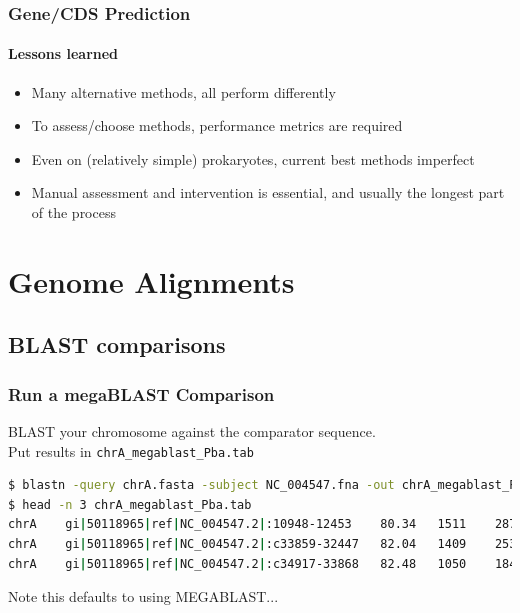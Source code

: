 \documentclass[table]{beamer}
\begin{document}
    \begin{frame}
      \frametitle{Gene/CDS Prediction}   
      \framesubtitle{Lessons learned}   
      \begin{itemize}
        \item Many alternative methods, all perform differently
        \item To assess/choose methods, performance metrics are required
        \item Even on (relatively simple) prokaryotes, current best methods imperfect
        \item Manual assessment and intervention is essential, and usually the longest part of the process
      \end{itemize}
    \end{frame}
    
    
\section{Genome Alignments}
  \subsection{BLAST comparisons}
  \begin{frame}[fragile]
    \frametitle{Run a megaBLAST Comparison}
    BLAST your chromosome against the comparator sequence. \\
    Put results in \texttt{chrA\_megablast\_Pba.tab}
\begin{lstlisting}[language=bash]
$ blastn -query chrA.fasta -subject NC_004547.fna -out chrA_megablast_Pba.tab -outfmt 6 
$ head -n 3 chrA_megablast_Pba.tab 
chrA	gi|50118965|ref|NC_004547.2|:10948-12453	80.34	1511	287	10	4579450	4580955	1506	1	0.0	1136
chrA	gi|50118965|ref|NC_004547.2|:c33859-32447	82.04	1409	253	0	4563151	4564559	1	1409	0.0	1201
chrA	gi|50118965|ref|NC_004547.2|:c34917-33868	82.48	1050	184	0	4562093	4563142	1	1050	0.0	 920
\end{lstlisting}
Note this defaults to using MEGABLAST...
\end{frame}
    
\end{document}
